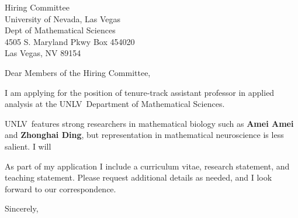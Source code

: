 \documentclass[11pt,a4paper]{letter}
\begin{document}
\def\School{UNLV}
\begin{letter}
{Hiring Committee\\
University of Nevada, Las Vegas\\
Dept of Mathematical Sciences\\
4505 S. Maryland Pkwy Box 454020\\
Las Vegas, NV 89154}


\opening{Dear Members of the Hiring Committee,}

I am applying for the position of tenure-track assistant professor in applied analysis at the \School~Department of Mathematical Sciences. 



\School~features strong researchers in mathematical biology such as \textbf{Amei Amei} and \textbf{Zhonghai Ding}, but representation in mathematical neuroscience is less salient. I will 



As part of my application I include a curriculum vitae, research statement, and teaching statement. Please request additional details as needed, and I look forward to our correspondence.

\closing{Sincerely,}
\end{letter}
\end{document}
